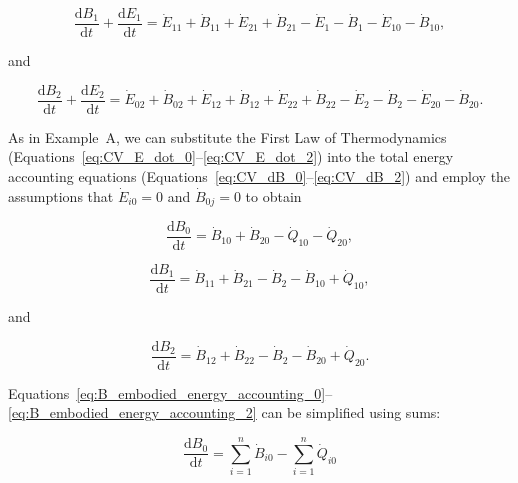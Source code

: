 \begin{equation} \label{eq:CV_dB_1}
	\frac{\mathrm{d}B_{1}}{\mathrm{d}t} 
	+ \frac{\mathrm{d}E_{1}}{\mathrm{d}t} 
	= \dot{E}_{11}
	+ \dot{B}_{11}
	+ \dot{E}_{21} 
	+ \dot{B}_{21} 
	- \dot{E}_1
	- \dot{B}_1
	- \dot{E}_{10} 
	- \dot{B}_{10},
\end{equation}

\noindent and 

\begin{equation} \label{eq:CV_dB_2}
	\frac{\mathrm{d}B_{2}}{\mathrm{d}t} 
	+ \frac{\mathrm{d}E_{2}}{\mathrm{d}t} 
	= \dot{E}_{02} 
	+ \dot{B}_{02} 
	+ \dot{E}_{12}
	+ \dot{B}_{12}
	+ \dot{E}_{22} 
	+ \dot{B}_{22} 
	- \dot{E}_{2} 
	- \dot{B}_{2} 
	- \dot{E}_{20} 
	- \dot{B}_{20}.
\end{equation}

As in Example~A, we can substitute the First Law of Thermodynamics 
(Equations~\ref{eq:CV_E_dot_0}--\ref{eq:CV_E_dot_2})
into the total energy accounting equations
(Equations~\ref{eq:CV_dB_0}--\ref{eq:CV_dB_2}) 
and employ the assumptions that 
$\dot{E}_{i0} = 0$ and
$\dot{B}_{0j} = 0$ 
to obtain

\begin{equation} \label{eq:B_embodied_energy_accounting_0}
	\frac{\mathrm{d}B_{0}}{\mathrm{d}t} 
	= \dot{B}_{10} 
	+ \dot{B}_{20} 
	- \dot{Q}_{10} 
	- \dot{Q}_{20}, 
\end{equation}

\begin{equation} \label{eq:B_embodied_energy_accounting_1}
	\frac{\mathrm{d}B_{1}}{\mathrm{d}t} 
	= \dot{B}_{11} 
	+ \dot{B}_{21}
	- \dot{B}_{2} 
	- \dot{B}_{10}
	+ \dot{Q}_{10},
\end{equation}

\noindent and

\begin{equation} \label{eq:B_embodied_energy_accounting_2}
	\frac{\mathrm{d}B_2}{\mathrm{d}t} 
	= \dot{B}_{12} 
	+ \dot{B}_{22} 
	- \dot{B}_{2}
	- \dot{B}_{20} 
	+ \dot{Q}_{20}.
\end{equation}

Equations~\ref{eq:B_embodied_energy_accounting_0}--\ref{eq:B_embodied_energy_accounting_2}
can be simplified using sums:

\begin{equation} \label{eq:B_embodied_energy_accounting_0_sum}
	\frac{\mathrm{d}B_{0}}{\mathrm{d}t} 
	= \sum\limits_{i=1}^n\dot{B}_{i0} 
	- \sum\limits_{i=1}^n\dot{Q}_{i0} 
\end{equation}

